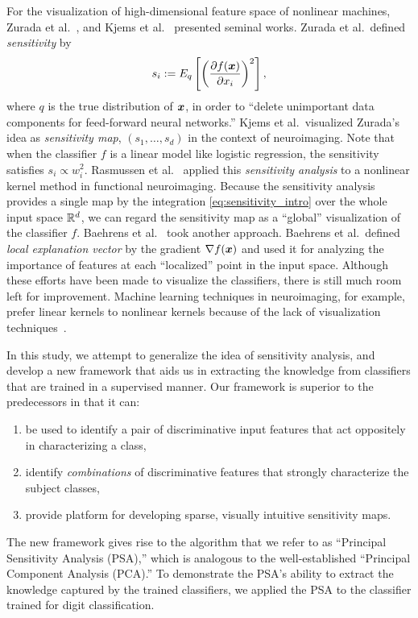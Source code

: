 For the visualization of high-dimensional feature space of nonlinear machines,
Zurada et al.~\cite{Zurada1994,Zurada1997},  and Kjems et al.~\cite{Kjems2002}
presented seminal works.
%
Zurada et al.\ defined \textit{sensitivity} by
\begin{equation}
 \label{eq:sensitivity_intro}
 s_i := E_q \left[ \left(\frac{\partial f(\mbox{\boldmath $x$})}{\partial x_i} \right)^2 \right],
\end{equation}
where $q$ is the true distribution of $\mbox{\boldmath $x$}$,
in order to ``delete unimportant data components for feed-forward neural networks.''
Kjems et al.\ visualized Zurada's idea as \textit{sensitivity map}, $\left(s_1, \dots, s_d\right)$
in the context of neuroimaging.
%
Note that when the classifier $f$ is a linear model like logistic
regression, the sensitivity satisfies $s_i \propto w_i^2$.
%
Rasmussen et al.~\cite{Rasmussen2011} applied this \textit{sensitivity analysis}
to a nonlinear kernel method in functional neuroimaging.
%
Because the sensitivity analysis provides a single map by the
integration \eqref{eq:sensitivity_intro} over the
whole input space $\mathbb{R}^{d}$, we can regard the sensitivity map as a
``global'' visualization of the classifier $f$.
%
Baehrens et al.~\cite{Baehrens2010} took another approach.
%
Baehrens et al.\ defined \textit{local explanation vector} by the
gradient $\nabla f (\mbox{\boldmath $x$})$ and used it for
analyzing the importance of features at each ``localized'' point in the
input space.
%
Although these efforts have been made to visualize the
classifiers,
there is still much room left for improvement.
%
Machine learning techniques in neuroimaging, for example,
prefer linear kernels to nonlinear kernels because of the lack of
visualization techniques~\cite{LaConte2005}.

In this study, we attempt to  generalize the idea of sensitivity
analysis, and develop a new framework that aids us in extracting the
knowledge from classifiers that are trained in a supervised manner.
%
Our framework is superior to the predecessors in that it can:
\begin{enumerate}
 \item be used to identify a pair of discriminative input
       features that act oppositely in characterizing a class,
 \item identify \textit{combinations} of discriminative features that strongly
       characterize the subject classes,
 \item provide platform for developing sparse, visually intuitive
       sensitivity maps.
\end{enumerate}
%
The new framework gives rise to the algorithm that we refer
to as ``Principal Sensitivity Analysis (PSA),'' which is analogous to
the well-established ``Principal Component Analysis (PCA).''
%
To demonstrate the PSA's ability to extract the knowledge captured by
the trained classifiers, we applied the PSA to the classifier trained
for digit classification.

